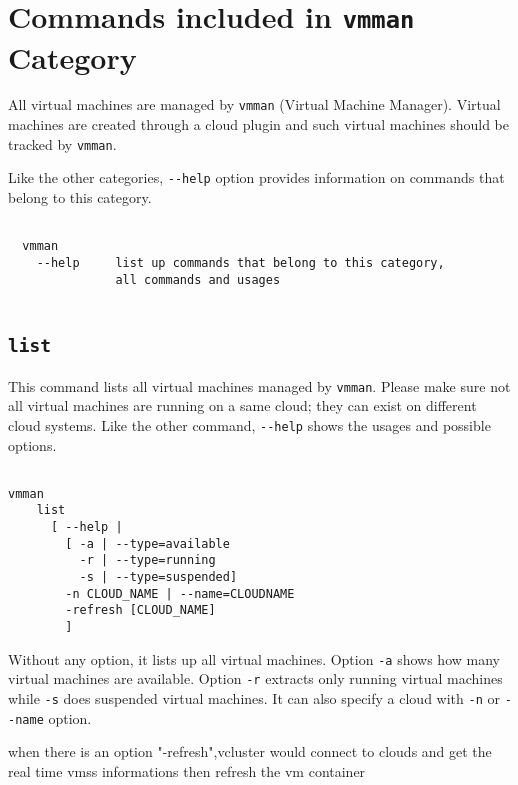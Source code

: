 \documentclass[11pt]{article}
\def \ttt{\texttt}
\def \vb{\verb}
\begin{document}
\newpage

\section{Commands included in \ttt{vmman} Category}

All virtual machines are managed by \vb+vmman+ (Virtual Machine Manager). Virtual machines are created through a cloud plugin and such virtual machines should be tracked by \vb+vmman+.

Like the other categories, \vb+--help+ option provides information on commands that belong to this category.


\begin{Verbatim}[fontfamily=courier, fontsize = \small, obeytabs
=true, tabsize=4, frame=lines]

  vmman 
    --help     list up commands that belong to this category, 
               all commands and usages
  
\end{Verbatim}


\subsection{\ttt{list}}

This command lists all virtual machines managed by \vb+vmman+. Please make sure not all virtual machines are running on a same cloud; they can exist on different cloud systems. Like the other command, \vb+--help+ shows the usages and possible options.

\begin{Verbatim}[fontfamily=courier, fontsize = \small, obeytabs
=true, tabsize=4, frame=lines]

vmman 
    list 
      [ --help |
        [ -a | --type=available 
          -r | --type=running 
          -s | --type=suspended]
        -n CLOUD_NAME | --name=CLOUDNAME  
        -refresh [CLOUD_NAME]
      	]
\end{Verbatim}

Without any option, it lists up all virtual machines. Option \vb+-a+ shows how many virtual machines are available. Option \vb+-r+ extracts only running virtual machines while \vb+-s+ does suspended virtual machines.  It can also specify a cloud with \vb+-n+ or \vb+--name+ option. 

when there is an option "-refresh",vcluster would connect to clouds and get the real time vmss
informations then refresh the vm container
\end{document}
